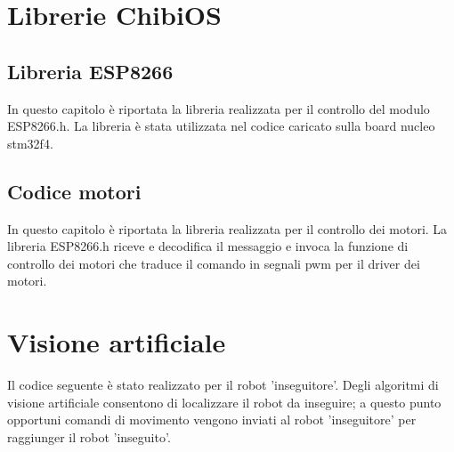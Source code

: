 \documentclass [11pt ,a4paper]{report}
\begin{document}
\begin{appendices}
  \chapter{Librerie ChibiOS}
		\section{Libreria ESP8266} \label{esp.h}
		In questo capitolo \`e riportata la libreria realizzata per il controllo del modulo ESP8266.h. La libreria \`e stata utilizzata nel codice caricato sulla board nucleo stm32f4.
		
	
	
	\section{Codice motori} \label{motor.h}
	In questo capitolo \`e riportata la libreria realizzata per il controllo dei motori. La libreria ESP8266.h riceve e decodifica il messaggio e invoca la funzione di controllo dei motori che traduce il comando in segnali pwm per il driver dei motori.


	\chapter{Visione artificiale} \label{vision}
	Il codice seguente \`e stato realizzato per il robot 'inseguitore'. Degli algoritmi di visione artificiale consentono di localizzare il robot da inseguire; a questo punto opportuni comandi di movimento vengono inviati al robot 'inseguitore' per raggiunger il robot 'inseguito'.

	
\end{appendices}
\end{document}
